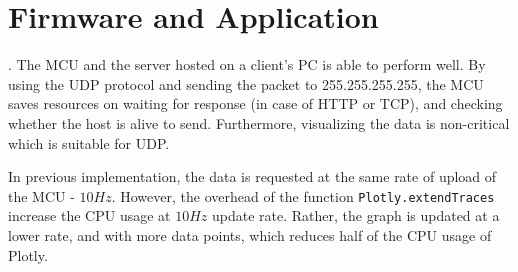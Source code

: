 \documentclass[../main.tex]{subfiles}
\begin{document}
    \pagebreak
    \section{Firmware and Application} \label{sec:result_fw_app}.
    \justify
    The MCU and the server hosted on a client's PC is able to perform well. By using the UDP protocol and sending the packet to 255.255.255.255, the MCU saves resources on waiting for response (in case of HTTP or TCP), and checking whether the host is alive to send. Furthermore, visualizing the data is non-critical which is suitable for UDP.

    \justify
    In previous implementation, the data is requested at the same rate of upload of the MCU - $10Hz$. However, the overhead of the function \lstinline{Plotly.extendTraces} increase the CPU usage at $10Hz$ update rate. Rather, the graph is updated at a lower rate, and with more data points, which reduces half of the CPU usage of Plotly.
\end{document}
